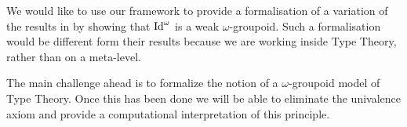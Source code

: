 We would like to use our framework to provide a formalisation of a
variation of the results in
\cite{lumsdaine10:weak-o-categories,berg08:types-are} by showing that
$\mathrm{Id}^\omega$ is a weak $\omega$-groupoid. Such a formalisation would be different form
their results because we are working inside Type Theory, rather than on
a meta-level.

The main challenge ahead is to formalize the notion of a
$\omega$-groupoid model of Type Theory. Once this has been done we
will be able to eliminate the univalence axiom and provide a
computational interpretation of this principle.





